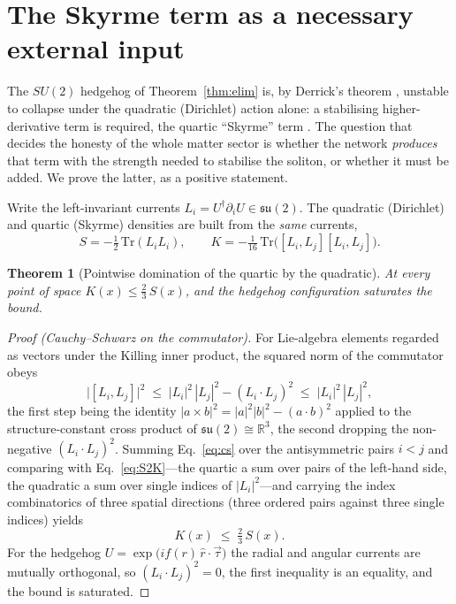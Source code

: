 \documentclass[aps,prd,reprint,nofootinbib,superscriptaddress,floatfix]{revtex4-2}
\theoremstyle{plain}
\newtheorem{theorem}{Theorem}
\newcommand{\su}[1]{SU(#1)}
\begin{document}
\section{The Skyrme term as a necessary external input}\label{sec:skyrme}

The $\su2$ hedgehog of Theorem~\ref{thm:elim} is, by Derrick's theorem
\cite{Derrick1964}, unstable to collapse under the quadratic (Dirichlet) action
alone: a stabilising higher-derivative term is required, the quartic ``Skyrme'' term
\cite{Skyrme1962}. The question that decides the honesty of the whole matter sector is
whether the network \emph{produces} that term with the strength needed to stabilise
the soliton, or whether it must be added. We prove the latter, as a positive
statement.

Write the left-invariant currents $L_i=U^\dagger\partial_i U\in\mathfrak{su}(2)$. The
quadratic (Dirichlet) and quartic (Skyrme) densities are built from the \emph{same}
currents,
\begin{equation}
S=-\tfrac12\,\mathrm{Tr}(L_iL_i),\qquad
K=-\tfrac1{16}\,\mathrm{Tr}\big([L_i,L_j][L_i,L_j]\big).
\label{eq:S2K}
\end{equation}

\begin{theorem}[Pointwise domination of the quartic by the quadratic]\label{thm:KleS}
At every point of space $K(x)\le\tfrac{2}{3}\,S(x)$, and the hedgehog configuration
saturates the bound.
\end{theorem}

\begin{proof}[Proof (Cauchy--Schwarz on the commutator)]
For Lie-algebra elements regarded as vectors under the Killing inner product, the
squared norm of the commutator obeys
\begin{equation}
\big|[L_i,L_j]\big|^2\;\le\;|L_i|^2\,|L_j|^2-(L_i\!\cdot\!L_j)^2\;\le\;|L_i|^2\,|L_j|^2,
\label{eq:cs}
\end{equation}
the first step being the identity $|a\times b|^2=|a|^2|b|^2-(a\cdot b)^2$ applied to
the structure-constant cross product of $\mathfrak{su}(2)\cong\mathbb{R}^3$, the
second dropping the non-negative $(L_i\!\cdot\!L_j)^2$. Summing Eq.~\eqref{eq:cs} over
the antisymmetric pairs $i<j$ and comparing with Eq.~\eqref{eq:S2K}---the quartic a
sum over pairs of the left-hand side, the quadratic a sum over single indices of
$|L_i|^2$---and carrying the index combinatorics of three spatial directions (three
ordered pairs against three single indices) yields
\begin{equation}
K(x)\;\le\;\tfrac{2}{3}\,S(x).
\label{eq:KleS}
\end{equation}
For the hedgehog $U=\exp\!\big(i f(r)\,\hat r\!\cdot\!\vec\tau\big)$ the radial and
angular currents are mutually orthogonal, so $(L_i\!\cdot\!L_j)^2=0$, the first
inequality is an equality, and the bound is saturated.
\end{proof}
\end{document}

